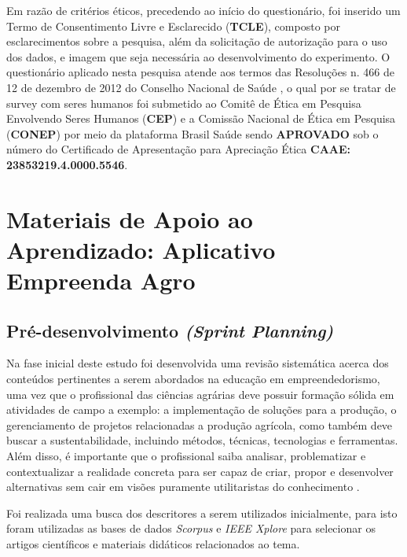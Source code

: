 Em razão de critérios éticos, precedendo ao início do questionário, foi inserido um Termo de Consentimento Livre e Esclarecido (\textbf{TCLE}), composto por esclarecimentos sobre a pesquisa, além da solicitação de autorização para o uso dos dados, e imagem que seja necessária ao desenvolvimento do experimento. O questionário aplicado nesta pesquisa atende aos termos das Resoluções n. 466 de 12 de dezembro de 2012 do Conselho Nacional de Saúde \cite{cns_resolucao_2012}, o qual por se tratar de survey com seres humanos foi submetido ao Comitê de Ética em Pesquisa Envolvendo Seres Humanos (\textbf{CEP}) e a Comissão Nacional de Ética em Pesquisa (\textbf{CONEP}) por meio da plataforma Brasil Saúde sendo \textbf{APROVADO} sob o número do Certificado de Apresentação para Apreciação Ética \textbf{CAAE: 23853219.4.0000.5546}.

\section{Materiais de Apoio ao Aprendizado: Aplicativo Empreenda Agro}


\subsection{Pré-desenvolvimento \textit{(Sprint Planning)}}

Na fase inicial deste estudo foi desenvolvida uma revisão sistemática acerca dos conteúdos pertinentes a serem abordados na educação em empreendedorismo, uma vez que o profissional das ciências agrárias deve possuir formação sólida em atividades de campo a exemplo: a implementação de soluções para a produção, o gerenciamento de projetos relacionadas a produção agrícola, como também deve buscar a sustentabilidade, incluindo métodos, técnicas, tecnologias e ferramentas. Além disso, é importante que o profissional saiba analisar, problematizar e contextualizar a realidade concreta para ser capaz de criar, propor e desenvolver alternativas sem cair em visões puramente utilitaristas do conhecimento \cite{cavalcanti_da_2019}.

Foi realizada uma busca dos descritores a serem utilizados inicialmente, para isto foram utilizadas as bases de dados \textit{Scorpus} e \textit{IEEE Xplore} para selecionar os artigos científicos e materiais didáticos relacionados ao tema.

